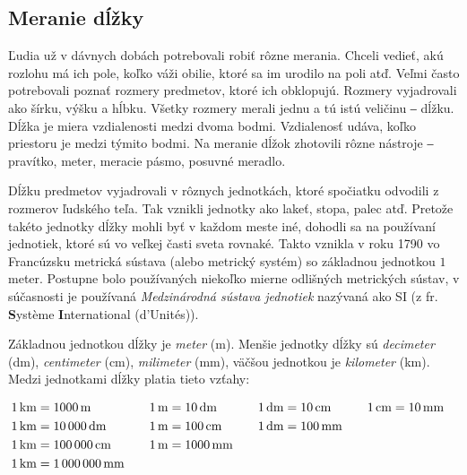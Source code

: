 \documentclass{report}
\begin{document}
\subsection{Meranie dĺžky}

Ľudia už v dávnych dobách potrebovali robiť rôzne merania. Chceli vedieť, akú rozlohu má ich pole, koľko váži obilie, ktoré sa im urodilo na poli atď. Veľmi často potrebovali poznať rozmery predmetov, ktoré ich obklopujú. Rozmery vyjadrovali ako šírku, výšku a hĺbku. Všetky rozmery merali jednu a tú istú veličinu ‒ dĺžku. Dĺžka je miera vzdialenosti medzi dvoma bodmi. Vzdialenosť udáva, koľko priestoru je medzi týmito bodmi. Na meranie dĺžok zhotovili rôzne nástroje ‒ pravítko, meter, meracie pásmo, posuvné meradlo.

Dĺžku predmetov vyjadrovali v rôznych jednotkách, ktoré spočiatku odvodili z rozmerov ľudského teľa. Tak vznikli jednotky ako lakeť, stopa, palec atď. Pretože takéto jednotky dĺžky mohli byť v každom meste iné, dohodli sa na používaní jednotiek, ktoré sú vo veľkej časti sveta rovnaké. Takto vznikla v roku 1790 vo Francúzsku metrická sústava (alebo metrický systém) so základnou jednotkou \(1\) meter. Postupne bolo používaných niekoľko mierne odlišných metrických sústav, v súčasnosti je používaná \emph{Medzinárodná sústava jednotiek} nazývaná ako SI (z fr. \textbf{S}ystème \textbf{I}nternational (d'Unités)).

Základnou jednotkou dĺžky je \emph{meter} (m). Menšie jednotky dĺžky sú \emph{decimeter} (dm), \emph{centimeter} (cm), \emph{milimeter} (mm), väčšou jednotkou je \emph{kilometer} (km). Medzi jednotkami dĺžky platia tieto vzťahy:

\vspace{1em}\noindent
\[
\begin{array}{@{}c@{\qquad}c@{\qquad}c@{\qquad}c@{}}
\begin{aligned}[t]
  \SI{1}{\km} &= \SI{1\,000}{\m} \\
  \SI{1}{\km} &= \SI{10\,000}{\dm} \\
  \SI{1}{\km} &= \SI{100\,000}{\cm} \\
  \SI{1}{\km} &= \SI{1\,000\,000}{\mm}
\end{aligned}
&
\begin{aligned}[t]
  \SI{1}{\m} &= \SI{10}{\dm} \\
  \SI{1}{\m} &= \SI{100}{\cm} \\
  \SI{1}{\m} &= \SI{1\,000}{\mm}
\end{aligned}
&
\begin{aligned}[t]
  \SI{1}{\dm} &= \SI{10}{\cm} \\
  \SI{1}{\dm} &= \SI{100}{\mm}
\end{aligned}
&
\begin{aligned}[t]
  \SI{1}{\cm} &= \SI{10}{\mm}
\end{aligned}
\end{array}
\]
\end{document}
